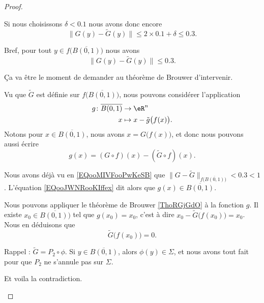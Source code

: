\begin{proof}
\begin{subproof}
		Si nous choisissons \( \delta<0.1\) nous avons donc encore
		\begin{equation}
			\| G(y)-\tilde G(y) \|\leq 2\times 0.1+\delta\leq 0.3.
		\end{equation}
	\end{subproof}
	Bref, pour tout \( y\in f\big( \overline{B(0,1)} \big)\) nous avons
	\begin{equation}		\label{EQooMIVFooPwKeSB}
		\| G(y)-\tilde  G(y) \|\leq 0.3.
	\end{equation}

	Ça va être le moment de demander au théorème de Brouwer d'intervenir.

	\begin{subproof}
		\spitem[Définition de \( g\)]

		Vu que \( \tilde G\) est définie sur \( f\big( \overline{B(0,1)} \big)\), nous pouvons considérer l'application
		\begin{equation}
			\begin{aligned}
				g\colon \overline{B(0,1)} & \to \eR^n                           \\
				x                         & \mapsto x-\tilde g\big( f(x) \big).
			\end{aligned}
		\end{equation}
		Notons pour \( x\in \overline{B(0,1)}\), nous avons \( x=G\big( f(x) \big)\), et donc nous pouvons aussi écrire
		\begin{equation}		\label{EQooJWNRooKIffex}
			g(x)=(G\circ f)(x)-(\tilde  G\circ f)(x).
		\end{equation}
		\spitem[\( g(x)\in \overline{B(0,1)}\) ]

		Nous avons déjà vu en \eqref{EQooMIVFooPwKeSB} que \( \| G-\tilde G \|_{f\big( \overline{B(0,1)} \big)}< 0.3<1\). L'équation \eqref{EQooJWNRooKIffex} dit alors que \( g(x)\in \overline{B(0,1)}\).

		\spitem[Brouwer]
		Nous pouvons appliquer le théorème de Brouwer \eqref{ThoRGjGdO} à la fonction \( g\). Il existe \( x_0\in \overline{B(0,1))}\) tel que \( g(x_0)=x_0\), c'est à dire \( x_0-\tilde G\big( f(x_0) \big)=x_0\). Nous en déduisons que
		\begin{equation}
			\tilde G\big( f(x_0) \big)=0.
		\end{equation}

		\spitem[La contradiction]
		Rappel : \( \tilde G=P_2\circ \phi\). Si \( y\in \overline{B(0,1)}\), alors \( \phi(y)\in \Sigma\), et nous avons tout fait pour que \( P_2\) ne s'annule pas sur \( \Sigma\).

		Et voila la contradiction.

	\end{subproof}
\end{proof}

